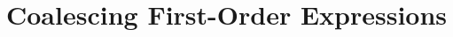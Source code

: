 \documentclass{easychair}
\newcommand{\sem}[1]{\ensuremath{[\![ #1 ]\!]}}
\newcommand{\false}{\textsf{ff}}
\newcommand{\FOL}[1]{\ensuremath{#1_{\textit{\scriptsize FOL}}}}
\newcommand{\folmodels}{\mathop{\models_{\textit{\scriptsize FOL}}}}
\newcommand{\btu}{\Box}
\newcommand{\fpr}{\overline}
\newcommand{\II}{\mathcal{I}}
\newcommand{\MM}{\mathcal{M}}
\renewcommand{\SS}{\mathcal{S}}
\newcommand{\VV}{\mathcal{V}}
\newcommand{\WW}{\mathcal{W}}
\newcommand{\XX}{\mathcal{X}}
\newcommand{\B}[1]{\framebox{\rule{0pt}{.6em}\ensuremath{\!\tlachars #1\!}}\,}
\newtheorem{theorem}{Theorem}
\newenvironment{proofsketch}{\par\noindent\textbf{Proof (sketch).}\quad}{\medskip}
\let\tlachars\relax
\begin{document}


\section{Coalescing First-Order Expressions}
\label{sec:coalescing-fol}
\end{document}
